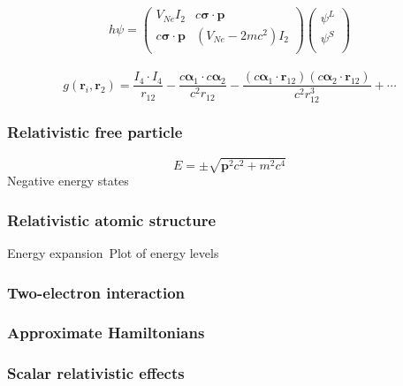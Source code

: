 \documentclass[mathserif,10pt]{beamer}
\begin{document}
\begin{frame}
\begin{columns}
\begin{column}{.50\textwidth}
    \end{column}
    \end{columns}
    \ \\
    \ \\
    \begin{equation}
        \nonumber
        h \psi = 
    	\begin{pmatrix}
	   V_{Ne} I_2 & c\boldsymbol{\sigma}\cdot\boldsymbol{p} \\
	   c\boldsymbol{\sigma}\cdot\boldsymbol{p} & (V_{Ne} - 2mc^2)I_2\\
    	\end{pmatrix}
    	\begin{pmatrix}
	   \psi^L\\
	    \psi^S\\ 
    	\end{pmatrix}
    \end{equation}
    \ \\
    \begin{equation}
        \nonumber
        g(\boldsymbol{r}_i,\boldsymbol{r}_2) = 
        \frac{I_4\cdot I_4}{r_{12}} - \frac{c\boldsymbol{\alpha}_1\cdot c\boldsymbol{\alpha}_2}{c^2r_{12}} -
        \frac{(c\boldsymbol{\alpha}_1\cdot \boldsymbol{r}_{12})(c\boldsymbol{\alpha}_2\cdot \boldsymbol{r}_{12})}{c^2r_{12}^3}
        + \cdots
    \end{equation}
\end{frame}

\begin{frame}
    \frametitle{Relativistic free particle}
    \begin{equation}
	E = \pm \sqrt{\boldsymbol{p}^2c^2+m^2c^4}
    \end{equation}
    Negative energy states
\end{frame}

\begin{frame}
    \frametitle{Relativistic atomic structure}
    Energy expansion\
    Plot of energy levels
\end{frame}

\begin{frame}
    \frametitle{Two-electron interaction}
\end{frame}

\begin{frame}
    \frametitle{Approximate Hamiltonians}
\end{frame}

\begin{frame}
    \frametitle{Scalar relativistic effects}
\end{frame}
\end{document}
